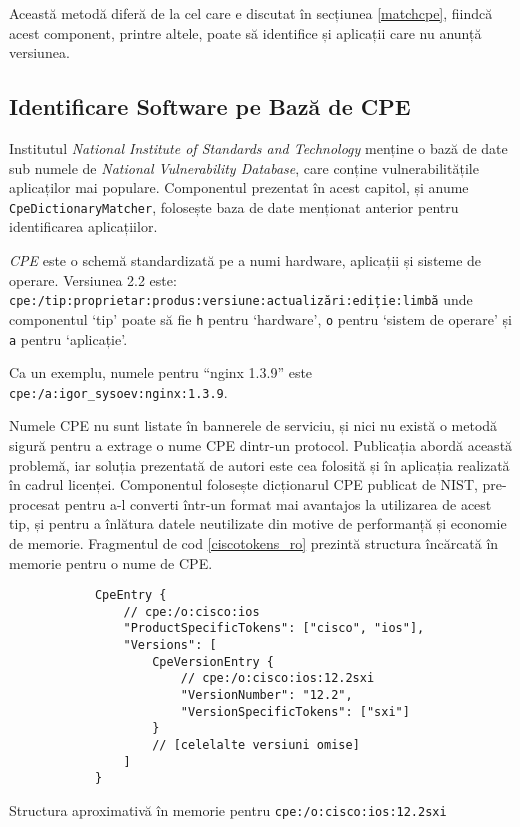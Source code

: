 	Această metodă diferă de la cel care e discutat în secțiunea \ref{matchcpe}, fiindcă acest component, printre altele, poate să identifice și aplicații care nu anunță versiunea.
	
\subsection*{Identificare Software pe Bază de CPE}

	Institutul \textit{National Institute of Standards and Technology} menține o bază de date sub numele de \textit{National Vulnerability Database}, care conține vulnerabilitățile aplicaților mai populare. Componentul prezentat în acest capitol, și anume \texttt{CpeDictionaryMatcher}, folosește baza de date menționat anterior pentru identificarea aplicațiilor.
	
	\textit{CPE} este o schemă standardizată pe a numi hardware, aplicații și sisteme de operare\cite{cpe22}. Versiunea 2.2 este: \texttt{cpe:/tip:proprietar:produs:versiune:actualizări:ediție:limbă} unde componentul `tip' poate să fie \texttt{h} pentru `hardware', \texttt{o} pentru `sistem de operare' și \texttt{a} pentru `aplicație'.
	
	Ca un exemplu, numele pentru ``nginx 1.3.9'' este \texttt{cpe:/a:igor_sysoev:nginx:1.3.9}.
	
	Numele CPE nu sunt listate în bannerele de serviciu, și nici nu există o metodă sigură pentru a extrage o nume CPE dintr-un protocol. Publicația \cite{shovat15} abordă această problemă, iar soluția prezentată de autori este cea folosită și în aplicația realizată în cadrul licenței. Componentul folosește dicționarul CPE publicat de NIST, pre-procesat pentru a-l converti într-un format mai avantajos la utilizarea de acest tip, și pentru a înlătura datele neutilizate din motive de performanță și economie de memorie. Fragmentul de cod \ref{ciscotokens_ro} prezintă structura încărcată în memorie pentru o nume de CPE.
	
	\begin{listing}[H]
		\begin{verbatim}
			CpeEntry {
				// cpe:/o:cisco:ios
				"ProductSpecificTokens": ["cisco", "ios"],
				"Versions": [
					CpeVersionEntry {
						// cpe:/o:cisco:ios:12.2sxi
						"VersionNumber": "12.2",
						"VersionSpecificTokens": ["sxi"]
					}
					// [celelalte versiuni omise]
				]
			}
		\end{verbatim}
		\caption{Structura aproximativă în memorie pentru \texttt{cpe:/o:cisco:ios:12.2sxi}}
		\label{ciscotokens_ro}
	\end{listing}
	
